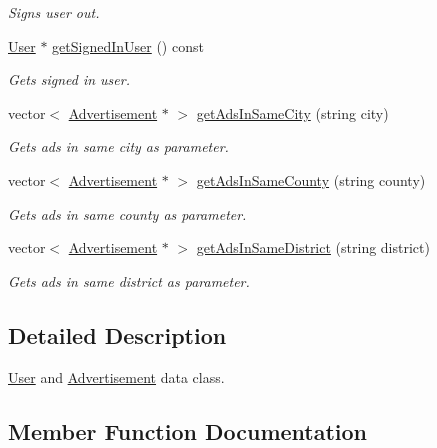 \begin{DoxyCompactItemize}
\begin{DoxyCompactList}\small\item\em Signs user out. \end{DoxyCompactList}\item 
\hyperlink{class_user}{User} $\ast$ \hyperlink{class_data_a2e6708aea5868f9cda03563018e530bd}{get\+Signed\+In\+User} () const 
\begin{DoxyCompactList}\small\item\em Gets signed in user. \end{DoxyCompactList}\item 
vector$<$ \hyperlink{class_advertisement}{Advertisement} $\ast$ $>$ \hyperlink{class_data_afd47f962d9f835cd66905fcafd1a0af7}{get\+Ads\+In\+Same\+City} (string city)
\begin{DoxyCompactList}\small\item\em Gets ads in same city as parameter. \end{DoxyCompactList}\item 
vector$<$ \hyperlink{class_advertisement}{Advertisement} $\ast$ $>$ \hyperlink{class_data_aaee3cddf7c073f9e2aa9f84e13b03ba8}{get\+Ads\+In\+Same\+County} (string county)
\begin{DoxyCompactList}\small\item\em Gets ads in same county as parameter. \end{DoxyCompactList}\item 
vector$<$ \hyperlink{class_advertisement}{Advertisement} $\ast$ $>$ \hyperlink{class_data_af31d6cf3249bfdff2f4ab4ed8d2676c5}{get\+Ads\+In\+Same\+District} (string district)
\begin{DoxyCompactList}\small\item\em Gets ads in same district as parameter. \end{DoxyCompactList}\end{DoxyCompactItemize}


\subsection{Detailed Description}
\hyperlink{class_user}{User} and \hyperlink{class_advertisement}{Advertisement} data class. 

\subsection{Member Function Documentation}
\hypertarget{class_data_afd47f962d9f835cd66905fcafd1a0af7}{}

